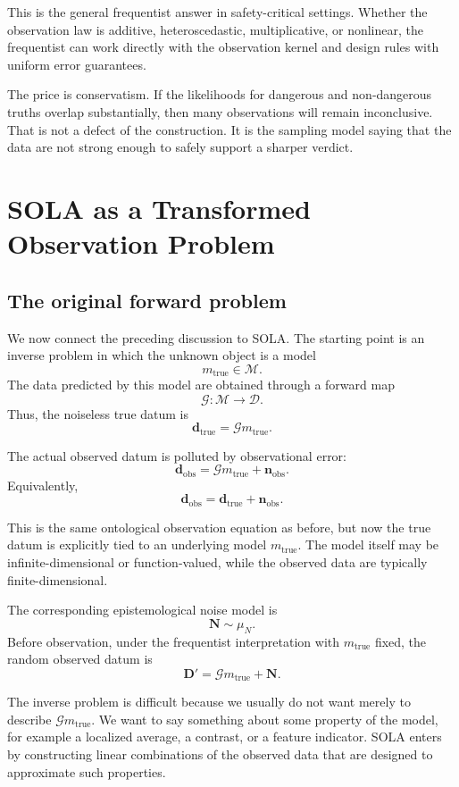 \documentclass[11pt]{article}
\newcommand{\Mspace}{\mathcal M}
\newcommand{\Dspace}{\mathcal D}
\newcommand{\muN}{\mu_N}
\newcommand{\Dobsrand}{\mathbf D'}
\newcommand{\Nrand}{\mathbf N}
\newcommand{\dtrue}{\mathbf d_{\mathrm{true}}}
\newcommand{\dobs}{\mathbf d_{\mathrm{obs}}}
\newcommand{\nobs}{\mathbf n_{\mathrm{obs}}}
\newcommand{\G}{\mathcal G}
\begin{document}
This is the general frequentist answer in safety-critical settings. Whether the observation law is additive, heteroscedastic, multiplicative, or nonlinear, the frequentist can work directly with the observation kernel and design rules with uniform error guarantees.

The price is conservatism. If the likelihoods for dangerous and non-dangerous truths overlap substantially, then many observations will remain inconclusive. That is not a defect of the construction. It is the sampling model saying that the data are not strong enough to safely support a sharper verdict.

\section{SOLA as a Transformed Observation Problem}

\subsection{The original forward problem}

We now connect the preceding discussion to SOLA. The starting point is an inverse problem in which the unknown object is a model
\[
    m_{\mathrm{true}}\in\Mspace.
\]
The data predicted by this model are obtained through a forward map
\[
    \G:\Mspace\to\Dspace.
\]
Thus, the noiseless true datum is
\[
    \dtrue=\G m_{\mathrm{true}}.
\]

The actual observed datum is polluted by observational error:
\[
    \dobs
    =
    \G m_{\mathrm{true}}
    +
    \nobs.
\]
Equivalently,
\[
    \dobs=\dtrue+\nobs.
\]

This is the same ontological observation equation as before, but now the true datum is explicitly tied to an underlying model \(m_{\mathrm{true}}\). The model itself may be infinite-dimensional or function-valued, while the observed data are typically finite-dimensional.

The corresponding epistemological noise model is
\[
    \Nrand\sim\muN.
\]
Before observation, under the frequentist interpretation with \(m_{\mathrm{true}}\) fixed, the random observed datum is
\[
    \Dobsrand
    =
    \G m_{\mathrm{true}}
    +
    \Nrand.
\]

The inverse problem is difficult because we usually do not want merely to describe \(\G m_{\mathrm{true}}\). We want to say something about some property of the model, for example a localized average, a contrast, or a feature indicator. SOLA enters by constructing linear combinations of the observed data that are designed to approximate such properties.
\end{document}
